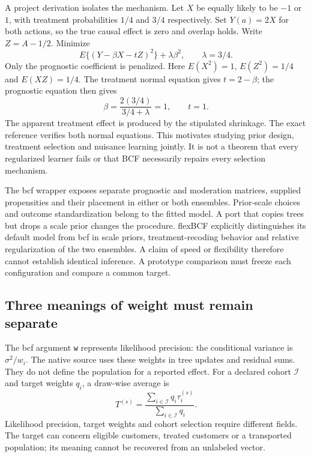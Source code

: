 A project derivation isolates the mechanism. Let $X$ be equally likely to be $-1$ or $1$, with treatment probabilities $1/4$ and $3/4$ respectively. Set $Y(a)=2X$ for both actions, so the true causal effect is zero and overlap holds. Write $Z=A-1/2$. Minimize
\begin{equation}
 E\{(Y-\beta X-tZ)^2\}+\lambda\beta^2,
 \qquad \lambda=3/4.
 \label{exec21:cxx-shrink-objective}
\end{equation}
Only the prognostic coefficient is penalized. Here $E(X^2)=1$, $E(Z^2)=1/4$ and $E(XZ)=1/4$. The treatment normal equation gives $t=2-\beta$; the prognostic equation then gives
\begin{equation}
 \beta=\frac{2(3/4)}{3/4+\lambda}=1,
 \qquad t=1.
 \label{exec21:cxx-shrink-result}
\end{equation}
The apparent treatment effect is produced by the stipulated shrinkage. The exact reference verifies both normal equations. This motivates studying prior design, treatment selection and nuisance learning jointly. It is not a theorem that every regularized learner fails or that BCF necessarily repairs every selection mechanism.\citep{exec21_cxx_reference,exec21_cxx_hahn}

The bcf wrapper exposes separate prognostic and moderation matrices, supplied propensities and their placement in either or both ensembles. Prior-scale choices and outcome standardization belong to the fitted model. A port that copies trees but drops a scale prior changes the procedure. flexBCF explicitly distinguishes its default model from bcf in scale priors, treatment-recoding behavior and relative regularization of the two ensembles. A claim of speed or flexibility therefore cannot establish identical inference. A prototype comparison must freeze each configuration and compare a common target.\citep{exec21_cxx_bcf,exec21_cxx_flexbcf}

\subsection{Three meanings of weight must remain separate}
\label{exec21:cxx-weights}
The bcf argument \texttt{w} represents likelihood precision: the conditional variance is $\sigma^2/w_i$. The native source uses these weights in tree updates and residual sums. They do not define the population for a reported effect. For a declared cohort $\mathcal I$ and target weights $q_i$, a draw-wise average is
\begin{equation}
 T^{(s)}=\frac{\sum_{i\in\mathcal I}q_i\tau_i^{(s)}}{\sum_{i\in\mathcal I}q_i}.
 \label{exec21:cxx-aggregate}
\end{equation}
Likelihood precision, target weights and cohort selection require different fields. The target can concern eligible customers, treated customers or a transported population; its meaning cannot be recovered from an unlabeled vector.\citep{exec21_cxx_bcf,exec21_cxx_flexbcf}

